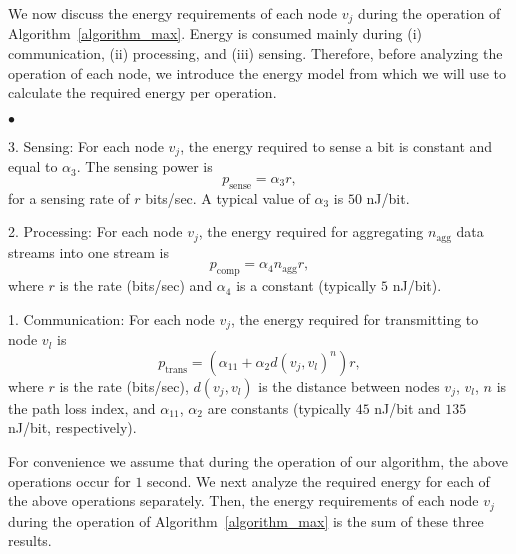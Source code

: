 \documentclass[twocolumn]{autart}    %
\newenvironment{list4}{
	\begin{list}{$\bullet$}{%
			\setlength{\itemsep}{0.05cm}
			\setlength{\labelsep}{0.2cm}
			\setlength{\labelwidth}{0.3cm}
			\setlength{\parsep}{0in} 
			\setlength{\parskip}{0in}
			\setlength{\topsep}{0in} 
			\setlength{\partopsep}{0in}
			\setlength{\leftmargin}{0.16in}}}
	{\end{list}}
\begin{document}
We now discuss the energy requirements of each node $v_j$ during the operation of Algorithm~\ref{algorithm_max}. 
Energy is consumed mainly during (i) communication, (ii) processing, and (iii) sensing. 
Therefore, before analyzing the operation of each node, we introduce the energy model from \cite{2002:Chandrakasan} which we will use to calculate the required energy per operation. 
\begin{list4}
\item[3. Sensing:] For each node $v_j$, the energy required to sense a bit is constant and equal to $\alpha_3$. The sensing power is 
\begin{equation}\label{eq_sense}
p_{\text{sense}} = \alpha_3 r ,
\end{equation}
for a sensing rate of $r$ bits/sec. A typical value of $\alpha_3$ is $50$ nJ/bit. 
\item [2. Processing:] For each node $v_j$, the energy required for aggregating $n_{\text{agg}}$ data streams into one stream is 
\begin{equation}\label{eq_process}
p_{\text{comp}} = \alpha_4 n_{\text{agg}} r ,
\end{equation}
where $r$ is the rate (bits/sec) and $\alpha_4$ is a constant (typically $5$ nJ/bit). 
\item[1. Communication:] For each node $v_j$, the energy required for transmitting to node $v_l$ is 
\begin{equation}\label{eq_trans}
p_{\text{trans}} = (\alpha_{11} + \alpha_{2} d(v_j, v_l)^n) r , 
\end{equation}
where $r$ is the rate (bits/sec), $d(v_j, v_l)$ is the distance between nodes $v_j$, $v_l$, $n$ is the path loss index, and $\alpha_{11}$,  $\alpha_{2}$ are constants (typically $45$ nJ/bit and $135$ nJ/bit, respectively). 
\end{list4}

For convenience we assume that during the operation of our algorithm, the above operations occur for $1$ second. 
We next analyze the required energy for each of the above operations separately. 
Then, the energy requirements of each node $v_j$ during the operation of Algorithm~\ref{algorithm_max} is the sum of these three results. 
\end{document}
